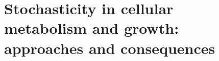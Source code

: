 \chapter{Stochasticity in cellular metabolism and growth: approaches and consequences}
\label{chapter:literaturereview}

